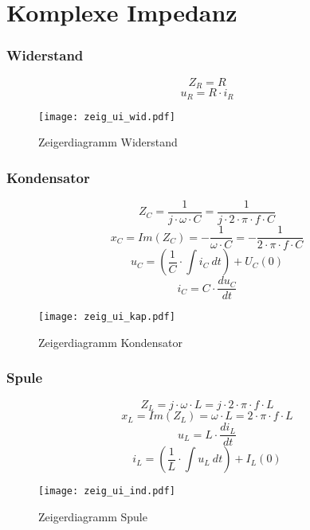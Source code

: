 



\section{Komplexe Impedanz}

\subsubsection{Widerstand}
\[ Z_R = R \]
\[ u_R = R \cdot i_R \]
\begin{figure}[h!]
	\centering
	\texttt{[image: zeig\_ui\_wid.pdf]}
	\caption{Zeigerdiagramm Widerstand}
	\label{fig:zeig_ui_wid}
\end{figure}

\subsubsection{Kondensator}
\[ Z_C = \frac{1}{j \cdot \omega \cdot C} 
= \frac{1}{j \cdot 2 \cdot \pi \cdot f \cdot C} \]
\[ x_C = Im(Z_C) = -\frac{1}{\omega \cdot C} 
= -\frac{1}{2 \cdot \pi \cdot f \cdot C} \]
\[ u_C = \left( \frac{1}{C} \cdot \int i_C ~ dt \right) + U_C(0) \]
\[ i_C = C \cdot \frac{du_C}{dt} \]
\begin{figure}[h!]
	\centering
	\texttt{[image: zeig\_ui\_kap.pdf]}
	\caption{Zeigerdiagramm Kondensator}
	\label{fig:zeig_ui_kap}
\end{figure}

\subsubsection{Spule}
\[ Z_L = j \cdot \omega \cdot L = j \cdot 2 \cdot \pi \cdot f \cdot L \]
\[ x_L = Im(Z_L) = \omega \cdot L = 2 \cdot \pi \cdot f \cdot L \]
\[ u_L = L \cdot \frac{di_L}{dt} \]
\[ i_L = \left( \frac{1}{L} \cdot \int u_L ~ dt \right) + I_L(0) \]
\begin{figure}[h!]
	\centering
	\texttt{[image: zeig\_ui\_ind.pdf]}
	\caption{Zeigerdiagramm Spule}
	\label{fig:zeig_ui_ind}
\end{figure}
